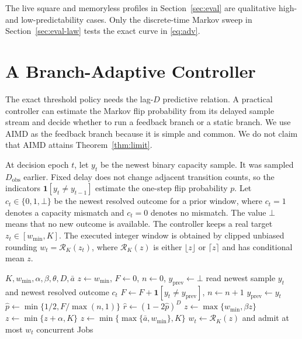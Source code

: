 The live square and memoryless profiles in Section~\ref{sec:eval} are qualitative
high- and low-predictability cases. Only the discrete-time Markov sweep in
Section~\ref{sec:eval-law} tests the exact curve in \eqref{eq:adv}.

\section{A Branch-Adaptive Controller}
\label{sec:controller}

The exact threshold policy needs the lag-$D$ predictive relation. A practical
controller can estimate the Markov flip probability from its delayed sample
stream and decide whether to run a feedback branch or a static branch. We use
AIMD as the feedback branch because it is simple and common. We do not claim that
AIMD attains Theorem~\ref{thm:limit}.

At decision epoch $t$, let $y_t$ be the newest binary capacity sample. It was
sampled $D_{\mathrm{obs}}$ earlier. Fixed delay does not change adjacent
transition counts, so the indicators $\mathbf 1[y_t\neq y_{t-1}]$ estimate the
one-step flip probability $p$. Let $c_t\in\{0,1,\bot\}$ be the newest resolved
outcome for a prior window, where $c_t=1$ denotes a capacity mismatch and
$c_t=0$ denotes no mismatch. The value $\bot$ means that no new outcome is
available. The controller keeps a real target $z_t\in[w_{\min},K]$. The executed
integer window is obtained by clipped unbiased rounding
$w_t=\mathcal R_K(z_t)$, where $\mathcal R_K(z)$ is either $\lfloor z\rfloor$ or
$\lceil z\rceil$ and has conditional mean $z$.

\begin{algorithm}[t]
\caption{Branch-adaptive admission for one contended unit}
\label{alg:adaptive}
\begin{algorithmic}[1]
\Require $K,w_{\min},\alpha,\beta,\theta,D,\bar a$
\State $z\gets w_{\min}$, $F\gets0$, $n\gets0$, $y_{\mathrm{prev}}\gets\bot$
  \State read newest sample $y_t$ and newest resolved outcome $c_t$
    \State $F\gets F+\mathbf 1[y_t\neq y_{\mathrm{prev}}]$, $n\gets n+1$
  \EndIf
  \State $y_{\mathrm{prev}}\gets y_t$
  \State $\hat p\gets\min\{1/2,F/\max(n,1)\}$
  \State $\hat r\gets(1-2\hat p)^D$
      \State $z\gets\max\{w_{\min},\beta z\}$
      \State $z\gets\min\{z+\alpha,K\}$
    \EndIf
  \Else
    \State $z\gets\min\{\max\{\bar a,w_{\min}\},K\}$
  \EndIf
  \State $w_t\gets\mathcal R_K(z)$ and admit at most $w_t$ concurrent Jobs
\EndFor
\end{algorithmic}
\end{algorithm}

